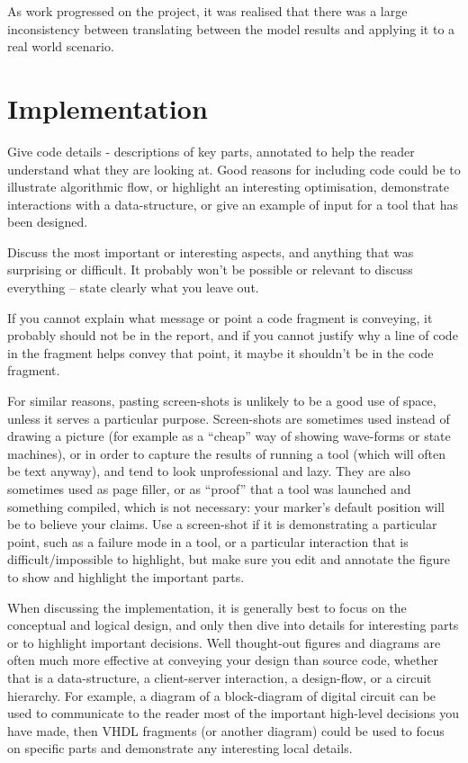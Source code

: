 \documentclass[10pt,onecolumn,letterpaper]{article}
\begin{document}
As work progressed on the project, it was realised that there was a large inconsistency between translating between the model results and applying it to a real world scenario.

\newpage

\section{Implementation} \label{implementation}

\iffalse
Give code details - descriptions of key parts, annotated to help the reader understand what they are looking at. Good reasons for including code could be to illustrate algorithmic flow, or highlight an interesting optimisation, demonstrate interactions with a data-structure, or give an example of input for a tool that has been designed.

Discuss the most important or interesting aspects, and anything that was surprising or difficult. It probably won't be possible or relevant to discuss everything – state clearly what you leave out.

If you cannot explain what message or point a code fragment is conveying,  it probably should not be in the report, and if you cannot justify why a line of code in the fragment helps convey that point, it maybe it shouldn’t be in the code fragment.

For similar reasons, pasting screen-shots is unlikely to be a good use of space, unless it serves a particular purpose. Screen-shots are sometimes used instead of drawing a picture (for example as a “cheap” way of showing wave-forms or state machines), or in order to capture the results of running a tool (which will often be text anyway), and tend to look unprofessional and lazy. They are also sometimes used as page filler, or as “proof” that a tool was launched and something compiled, which is not necessary: your marker’s default position will be to believe your claims. Use a screen-shot if it is demonstrating a particular point, such as a failure mode in a tool, or a particular interaction that is difficult/impossible to highlight, but make sure you edit and annotate the figure to show and highlight the important parts.

When discussing the implementation, it is generally best to focus on the conceptual and logical design, and only then dive into details for interesting parts or to highlight important decisions. Well thought-out figures and diagrams are often much more effective at conveying your design than source code, whether that is a data-structure, a client-server interaction, a design-flow, or a circuit hierarchy. For example, a diagram of a block-diagram of digital circuit can be used to communicate to the reader most of the important high-level  decisions you have made, then VHDL fragments (or another diagram) could be used to focus on specific parts and demonstrate any interesting local details.
\end{document}
